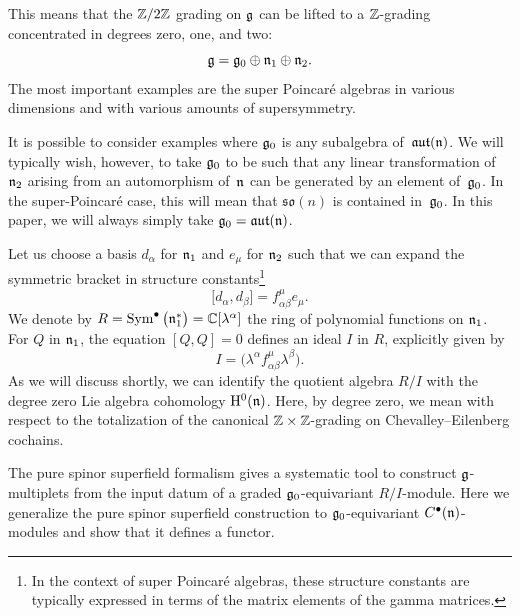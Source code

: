 \documentclass[pdftex]{sigma}
\numberwithin{equation}{section}
\def\lie#1{\ensuremath{\mathfrak{#1}}}
\def\aut{\ensuremath{\lie{aut}}}
\def\so{\lie{so}}
\DeclareMathOperator{\Sym}{Sym}
\begin{document}
This means that the $\mathbb Z/2\mathbb Z$ grading on $\mathfrak g$ can be lifted to a $\mathbb Z$-grading concentrated in degrees zero, one, and two:
\begin{equation*}
\mathfrak g = \mathfrak g_0 \oplus \mathfrak n_1 \oplus \mathfrak n_2.
\end{equation*}
The most important examples are the super Poincar\'e algebras in various dimensions and with various amounts of supersymmetry.

It is possible to consider examples where $\mathfrak g_0$ is any subalgebra of~$\aut(\fn)$. We will typically wish, however, to take $\mathfrak g_0$ to
be such that any linear transformation of $\mathfrak n_2$ arising from an automorphism of~$\mathfrak n$ can be generated by an element of~$\mathfrak g_0$.
In the super-Poincar\'e case, this will mean that $\so(n)$ is contained in~$\mathfrak g_0$. In this paper, we will always simply take $\fg_0 = \aut(\fn)$.

Let us choose a basis $d_\alpha$ for $\mathfrak n_1$ and $e_\mu$ for $\mathfrak n_2$ such that we can expand the symmetric bracket in structure constants\footnote{In the context of super Poincar\'e algebras, these structure constants are typically expressed in terms of the matrix elements of the gamma matrices.}
\begin{equation*}
\big[d_\alpha , d_\beta \big] = f^\mu_{\alpha \beta} e_\mu .
\end{equation*}
We denote by $R = \Sym^\bullet\big(\fn_1^*\big) = \CC[\lambda^\alpha]$ the ring of polynomial functions on $\mathfrak n_1$. For $Q$ in $\mathfrak n_1$, the equation $[Q,Q] = 0$ defines an ideal $I$ in $R$, explicitly given by
\begin{equation*}
I = \big(\lambda^\alpha f^\mu_{\alpha \beta} \lambda^\beta \big) .
\end{equation*}
As we will discuss shortly, we can identify the quotient algebra $R/I$ with the degree zero Lie algebra cohomology $\mathrm H^0(\mathfrak n)$. Here, by degree zero, we mean with respect to the totalization of the canonical $\mathbb Z \times \mathbb Z$-grading on Chevalley--Eilenberg cochains.

The pure spinor superfield formalism gives a systematic tool to construct $\mathfrak g$-multiplets from the input datum of a graded $\mathfrak g_0$-equivariant $R/I$-module. Here we generalize the pure spinor superfield construction to $\mathfrak g_0$-equivariant $C^\bullet(\mathfrak n)$-modules and show that it defines a functor.
\end{document}
